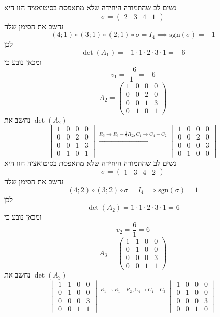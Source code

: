 \documentclass[12pt, titlepage]{article}
\begin{document}
נשים לב שהתמורה היחידה שלא מתאפסת בסיטואציה הזו היא
\[
    \sigma = \begin{pmatrix}
2 & 3 & 4 & 1
    \end{pmatrix}
\]
נחשב את הסימן שלה
\[
    \left(4;1\right)\circ\left(3;1\right)\circ\left(2;1\right)\circ\sigma = I_4 \implies \mathrm{sgn}\left(\sigma\right) = -1
\]
לכן
\[
    \det\left(A_1\right) = -1 \cdot 1 \cdot 2 \cdot 3 \cdot 1 = -6
\]
ומכאן נובע כי
\[
    v_1 = \frac{-6}{1} = -6
\]
\[
A_2 = \begin{pmatrix}
        1 & 0 & 0 & 0 \\
        0 & 0 & 2 & 0 \\
        0 & 0 & 1 & 3 \\
        0 & 1 & 0 & 1
    \end{pmatrix}
\]
נחשב את $\det\left(A_2\right)$
\[
\begin{vmatrix}
        1 & 0 & 0 & 0 \\
        0 & 0 & 2 & 0 \\
        0 & 0 & 1 & 3 \\
        0 & 1 & 0 & 1
    \end{vmatrix} \xrightarrow{R_3 \to R_3 - \frac{1}{2}R_2,C_4 \to C_4-C_2}
    \begin{vmatrix}
        1 & 0 & 0 & 0 \\
        0 & 0 & 2 & 0 \\
        0 & 0 & 0 & 3 \\
        0 & 1 & 0 & 0
    \end{vmatrix}
\]
נשים לב שהתמורה היחידה שלא מתאפסת בסיטואציה הזו היא
\[
    \sigma = \begin{pmatrix}
1 & 3 & 4 & 2
    \end{pmatrix}
\]
נחשב את הסימן שלה
\[
    \left(4;2\right)\circ\left(3;2\right)\circ\sigma = I_4 \implies \mathrm{sgn}\left(\sigma\right) = 1
\]
לכן
\[
    \det\left(A_2\right) = 1 \cdot 1 \cdot 2 \cdot 3 \cdot 1 = 6
\]
ומכאן נובע כי
\[
    v_2 = \frac{6}{1} = 6
\]
\[
    A_3 = \begin{pmatrix}
        1 & 1 & 0 & 0 \\
        0 & 1 & 0 & 0 \\
        0 & 0 & 0 & 3 \\
        0 & 0 & 1 & 1
    \end{pmatrix}
\]
נחשב את $\det\left(A_3\right)$
\[
\begin{vmatrix}
        1 & 1 & 0 & 0 \\
        0 & 1 & 0 & 0 \\
        0 & 0 & 0 & 3 \\
        0 & 0 & 1 & 1
    \end{vmatrix} \xrightarrow{R_1 \to R_1 - R_2,C_4 \to C_4-C_3}
    \begin{vmatrix}
        1 & 0 & 0 & 0 \\
        0 & 1 & 0 & 0 \\
        0 & 0 & 0 & 3 \\
        0 & 0 & 1 & 0
    \end{vmatrix}
\]
\end{document}
